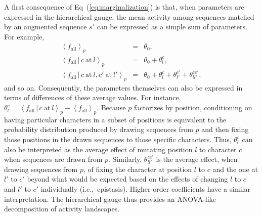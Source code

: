 \documentclass[10pt,letterpaper]{article}
\newcommand{\eq}[1]{Eq\ (\ref{#1})}
\newcommand{\braket}[1]{\left\langle #1 \right\rangle}
\begin{document}
A first consequence of \eq{eq:marginalization} is that, when parameters are expressed in the hierarchical gauge, the mean activity among sequences matched by an augmented sequence $s'$ can be expressed as a simple sum of parameters. For example,
\begin{eqnarray}
    \braket{f_\mathrm{all}}_{p} &=& \theta_{0}, \\
    \braket{f_\mathrm{all}\,|\,c\mathrm{~at~}l}_p &=& \theta_{0} + \theta_{l}^c, \\
    \braket{f_\mathrm{all}\,|\,c\mathrm{~at~}l,c'\mathrm{~at~}l'}_p &=& \theta_{0} + \theta_{l}^c + \theta_{l'}^{c'} + \theta_{ll'}^{cc'},
\end{eqnarray}
and so on. Consequently, the parameters themselves can also be expressed in terms of differences of these average values. For instance, $\theta_{l}^c= \braket{f_\mathrm{all}\,|\,c\mathrm{~at~}l}_p-\braket{f_\mathrm{all}}_{p}$. Because $p$ factorizes by position, conditioning on having particular characters in a subset of positions is equivalent to the probability distribution produced by drawing sequences from $p$ and then fixing those positions in the drawn sequences to those specific characters. Thus, $\theta_{l}^c$ can also be interpreted as the average effect of mutating position $l$ to character $c$ when sequences are drawn from $p$. Similarly, $\theta_{ll'}^{cc'}$ is the average effect, when drawing sequences from $p$, of fixing the character at position $l$ to $c$ and the one at $l'$ to $c'$ beyond what would be expected based on the effects of changing $l$ to $c$ and $l'$ to $c'$ individually (i.e.,\ epistasis). Higher-order coefficients have a similar interpretation. The hierarchical gauge thus provides an ANOVA-like decomposition of activity landscapes.
\end{document}
